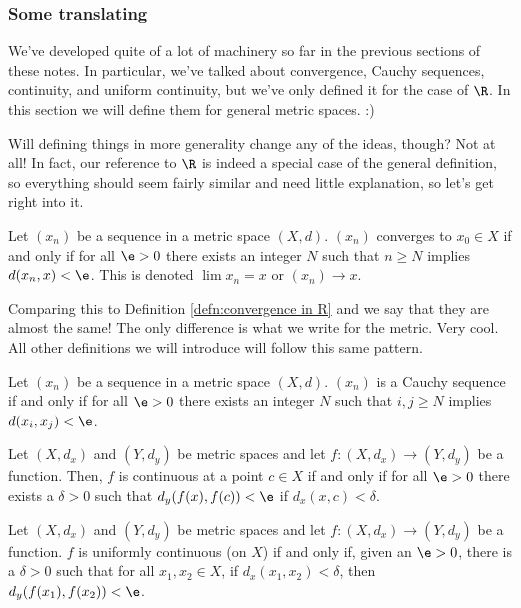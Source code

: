 \documentclass[class=article, crop=false]{standalone}
\begin{document}
\subsubsection*{Some translating}

We've developed quite of a lot of machinery so far in the previous sections of these notes. In particular, we've talked about convergence, Cauchy sequences, continuity, and uniform continuity, but we've only defined it for the case of $\R$. In this section we will define them for general metric spaces. :)

Will defining things in more generality change any of the ideas, though? Not at all! In fact, our reference to $\R$ is indeed a special case of the general definition, so everything should seem fairly similar and need little explanation, so let's get right into it.

\begin{defn}
    Let $(x_n)$ be a sequence in a metric space $(X,d)$. $(x_n)$ converges to $x_0 \in X$ if and only if for all $\e > 0$ there exists an integer $N$ such that $n \geq N$ implies $d(x_n,x) < \e$. This is denoted $\lim x_n = x$ or $(x_n) \to x$.
\end{defn}

Comparing this to Definition \ref{defn:convergence in R} and we say that they are almost the same! The only difference is what we write for the metric. Very cool. All other definitions we will introduce will follow this same pattern.

\begin{defn}
    Let $(x_n)$ be a sequence in a metric space $(X,d)$. $(x_n)$ is a Cauchy sequence if and only if for all $\e > 0$ there exists an integer $N$ such that $i,j \geq N$ implies $d(x_i,x_j) < \e$.
\end{defn}

\begin{defn}
    Let $(X,d_x)$ and $(Y,d_y)$ be metric spaces and let $f \colon (X,d_x) \to (Y,d_y)$ be a function. Then, $f$ is continuous at a point $c \in X$ if and only if for all $\e > 0$ there exists a $\delta > 0$ such that $d_y(f(x),f(c)) < \e$ if $d_x(x,c) < \delta$.
\end{defn}

\begin{defn}
    Let $(X,d_x)$ and $(Y,d_y)$ be metric spaces and let $f \colon (X,d_x) \to (Y,d_y)$ be a function. $f$ is uniformly continuous (on $X$) if and only if, given an $\e > 0$, there is a $\delta > 0$ such that for all $x_1,x_2 \in X$, if $d_x(x_1,x_2) < \delta$, then $d_y(f(x_1),f(x_2)) < \e$.
\end{defn}
\end{document}
